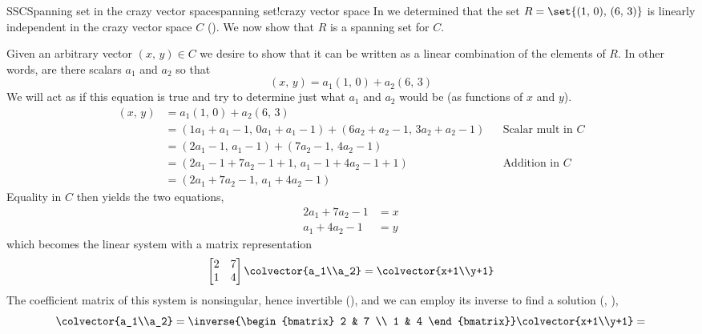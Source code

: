 \begin{example}{SSC}{Spanning set in the crazy vector space}{spanning set!crazy vector space}
In  we determined that the set $R=\set{(1,\,0),\,(6,\,3)}$ is linearly independent in the crazy vector space $C$ ().  We now show that $R$ is a spanning set for $C$.\par
%
Given an arbitrary vector $(x,\,y)\in C$ we desire to show that it can be written as a linear combination of the elements of $R$.  In other words, are there scalars $a_1$ and $a_2$ so that 
%
\begin{equation*}
(x,\,y)=a_1(1,\,0) + a_2(6,\,3)
\end{equation*}
%
We will act as if this equation is true and try to determine just what $a_1$ and $a_2$ would be (as functions of $x$ and $y$).
%
\begin{align*}
(x,\,y)&=a_1(1,\,0) + a_2(6,\,3)\\
&= (1a_1+a_1-1,\,0a_1+a_1-1) + (6a_2+a_2-1,\,3a_2+a_2-1)
&&\text{Scalar mult in $C$}\\
%
&= (2a_1-1,\,a_1-1) + (7a_2-1,\,4a_2-1)\\
%
&= (2a_1-1+7a_2-1+1,\,a_1-1+4a_2-1+1)
&&\text{Addition in $C$}\\
%
&= (2a_1+7a_2-1,\,a_1+4a_2-1)
\end{align*}
%
Equality in $C$ then yields the two equations,
%
\begin{align*}
2a_1+7a_2-1&=x\\
a_1+4a_2-1&=y
\end{align*}
%
which becomes the linear system with a matrix representation
%
\begin{equation*}
\begin{bmatrix}
2 & 7 \\ 1 & 4
\end{bmatrix}
\colvector{a_1\\a_2}
=
\colvector{x+1\\y+1}
\end{equation*}
%
The coefficient matrix of this system is nonsingular, hence invertible (), and we can employ its inverse to find a solution (, ),
%
\begin{equation*}
\colvector{a_1\\a_2}=
\inverse{\begin{bmatrix} 2 & 7 \\ 1 & 4 \end{bmatrix}}\colvector{x+1\\y+1}=

\end{equation*}
\end{example}
